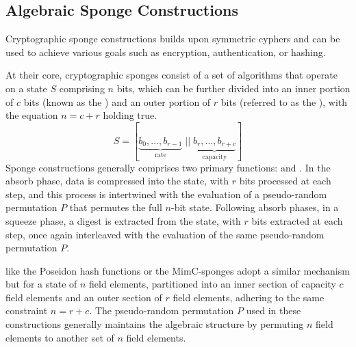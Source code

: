 \subsection{Algebraic Sponge Constructions}
Cryptographic sponge constructions \cite{bert-08} builds upon symmetric cyphers and can be used to achieve various goals such as encryption, authentication, or hashing. 

At their core, cryptographic sponges consist of a set of algorithms that operate on a state $S$ comprising $n$ bits, which can be further divided into an inner portion of $c$ bits (known as the ) and an outer portion of $r$ bits (referred to as the ), with the equation $n=c+r$ holding true. 
\begin{equation}
S = [\underbrace{b_0,\ldots,b_{r-1}}_{\text{rate}} \;||\; \underbrace{b_r,\ldots,b_{r+c}}_{\text{capacity}}]
\end{equation}
Sponge constructions generally comprises two primary functions:  and . In the absorb phase, data is compressed into the state, with $r$ bits processed at each step, and this process is intertwined with the evaluation of a pseudo-random permutation $P$ that permutes the full $n$-bit state. Following absorb phases, in a squeeze phase, a digest is extracted from the state, with $r$ bits extracted at each step, once again interleaved with the evaluation of the same pseudo-random permutation $P$.

 like the Poseidon hash functions \cite{lor-19} or the MimC-sponges \cite{albrecht-16} adopt a similar mechanism but for a state of $n$ field elements, partitioned into an inner section of capacity $c$ field elements and an outer section of $r$ field elements, adhering to the same constraint $n=r+c$. The pseudo-random permutation $P$ used in these constructions generally maintains the algebraic structure by permuting $n$ field elements to another set of $n$ field elements.  

